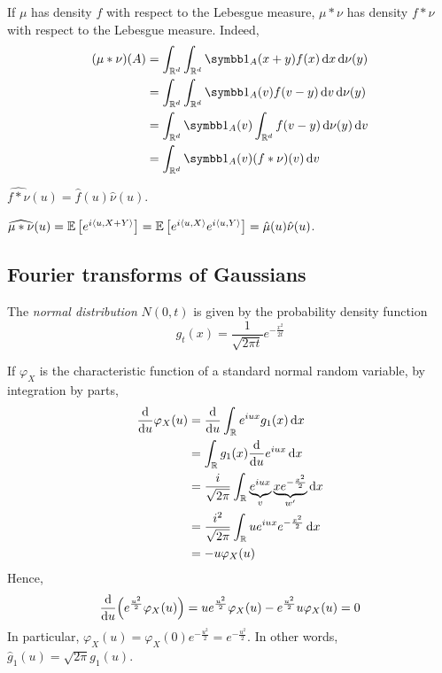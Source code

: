 If \( \mu \) has density \( f \) with respect to the Lebesgue measure, \( \mu \ast \nu \) has density \( f \ast \nu \) with respect to the Lebesgue measure.
Indeed,
\begin{align*}
	(\mu \ast \nu)(A) &= \int_{\mathbb R^d} \int_{\mathbb R^d} \symbb 1_A(x+y) f(x) \dd{x} \dd{\nu(y)} \\
	&= \int_{\mathbb R^d} \int_{\mathbb R^d} \symbb 1_A(v) f(v-y) \dd{v} \dd{\nu(y)} \\
	&= \int_{\mathbb R^d} \symbb 1_A(v) \int_{\mathbb R^d}f(v-y) \dd{\nu(y)} \dd{v} \\
	&= \int_{\mathbb R^d} \symbb 1_A(v) (f \ast \nu)(v) \dd{v}
\end{align*}
\begin{proposition}
	\( \widehat{f \ast \nu}(u) = \hat f(u) \hat \nu(u) \).
\end{proposition}
\begin{proposition}
	\( \widehat{\mu \ast \nu}(u) = \mathbb{E}\left[{e^{i\left\langle{u,X+Y}\right\rangle}}\right] = \mathbb{E}\left[{e^{i\left\langle{u,X}\right\rangle}e^{i\left\langle{u,Y}\right\rangle}}\right] = \hat \mu(u) \hat \nu(u) \).
\end{proposition}

\subsection{Fourier transforms of Gaussians}
\begin{definition}
	The \emph{normal distribution} \( N(0,t) \) is given by the probability density function
	\[ g_t(x) = \frac{1}{\sqrt{2\pi t}} e^{-\frac{x^2}{2t}} \]
\end{definition}
If \( \varphi_X \) is the characteristic function of a standard normal random variable, by integration by parts,
\begin{align*}
	\dv{u} \varphi_X(u) &= \dv{u} \int_{\mathbb R} e^{iux} g_1(x) \dd{x} \\
	&= \int_{\mathbb R} g_1(x) \dv{u} e^{iux} \dd{x} \\
	&= \frac{i}{\sqrt{2\pi}} \int_{\mathbb R} \underbrace{e^{iux}}_{v} \underbrace{x e^{-\frac{x^2}{2}}}_{w'} \dd{x} \\
	&= \frac{i^2}{\sqrt{2\pi}} \int_{\mathbb R} u e^{iux} e^{-\frac{x^2}{2}} \dd{x} \\
	&= -u \varphi_X(u)
\end{align*}
Hence,
\[ \dv{u}\qty(e^{\frac{u^2}{2}} \varphi_X(u)) = ue^{\frac{u^2}{2}} \varphi_X(u) - e^{\frac{u^2}{2}} u \varphi_X(u) = 0 \]
In particular, \( \varphi_X(u) = \varphi_X(0) e^{-\frac{u^2}{2}} = e^{-\frac{u^2}{2}} \).
In other words, \( \hat g_1(u) = \sqrt{2\pi} g_1(u) \).

